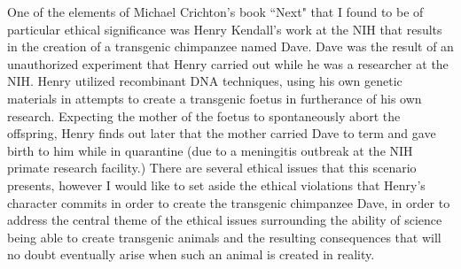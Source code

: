\documentclass[letterpaper,10pt,twoside]{article}
\begin{document}
One of the elements of Michael Crichton's book ``Next" that I found to be of particular ethical significance was Henry Kendall's work at the NIH that results in the creation of a transgenic chimpanzee named Dave.  Dave was the result of an unauthorized experiment that Henry carried out while he was a researcher at the NIH.  Henry utilized recombinant DNA techniques, using his own genetic materials in attempts to create a transgenic foetus in furtherance of his own research.  Expecting the mother of the foetus to spontaneously abort the offspring, Henry finds out later that the mother carried Dave to term and gave birth to him while in quarantine (due to a meningitis outbreak at the NIH primate research facility.)  There are several ethical issues that this scenario presents, however I would like to set aside the ethical violations that Henry's character commits in order to create the transgenic chimpanzee Dave, in order to address the central theme of the ethical issues surrounding the ability of science being able to create transgenic animals and the resulting consequences that will no doubt eventually arise when such an animal is created in reality.
\end{document}
